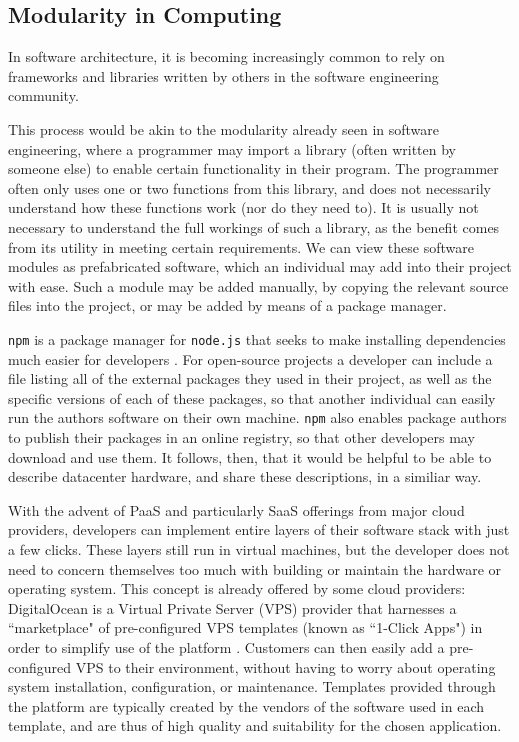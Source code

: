 \documentclass[11pt]{article}
\begin{document}
	\subsection{Modularity in Computing}
		In software architecture, it is becoming increasingly common to rely on frameworks and libraries written by others in the software engineering community. 

		This process would be akin to the modularity already seen in software engineering, where a programmer may import a library (often written by someone else) to enable certain functionality in their program. 
		The programmer often only uses one or two functions from this library, and does not necessarily understand how these functions work (nor do they need to).
		It is usually not necessary to understand the full workings of such a library, as the benefit comes from its utility in meeting certain requirements. 
		We can view these software modules as prefabricated software, which an individual may add into their project with ease. 
		Such a module may be added manually, by copying the relevant source files into the project, or may be added by means of a package manager.
		
		\verb|npm| is a package manager for \verb|node.js| that seeks to make installing dependencies much easier for developers \cite{Wittern2016}.
		For open-source projects a developer can include a file listing all of the external packages they used in their project, as well as the specific versions of each of these packages, so that another individual can easily run the authors software on their own machine.
		\verb|npm| also enables package authors to publish their packages in an online registry, so that other developers may download and use them.
		It follows, then, that it would be helpful to be able to describe datacenter hardware, and share these descriptions, in a similiar way. 

		With the advent of PaaS and particularly SaaS offerings from major cloud providers, developers can implement entire layers of their software stack with just a few clicks. 
		These layers still run in virtual machines, but the developer does not need to concern themselves too much with building or maintain the hardware or operating system.
		This concept is already offered by some cloud providers: DigitalOcean is a Virtual Private Server (VPS) provider that harnesses a ``marketplace" of pre-configured VPS templates (known as ``1-Click Apps") in order to simplify use of the platform \cite{DigitalOcean2020}. 
		Customers can then easily add a pre-configured VPS to their environment, without having to worry about operating system installation, configuration, or maintenance. 
		Templates provided through the platform are typically created by the vendors of the software used in each template, and are thus of high quality and suitability for the chosen application.
\end{document}
